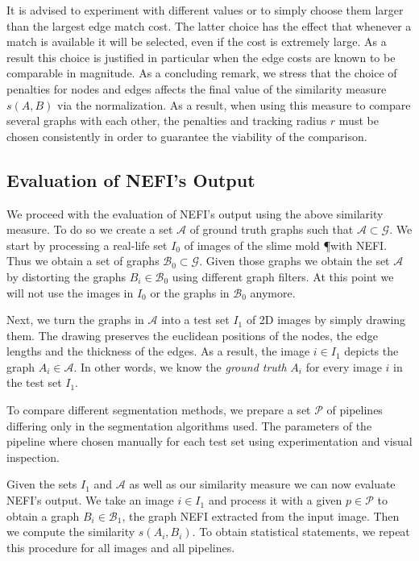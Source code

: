 		It is advised to experiment with different values or to simply choose them larger than the largest edge match cost. The latter choice has the effect that whenever a match is available it will be selected, even if the cost is extremely large. As a result this choice is justified in particular when the edge costs are known to be comparable in magnitude. As a concluding remark, we stress that the choice of penalties for nodes and edges affects the final value of the similarity measure $s(A, B)$ via the normalization. As a result, when using this measure to compare several graphs with each other, the penalties and tracking radius $r$ must be chosen consistently in order to guarantee the viability of the comparison.

	\subsection{Evaluation of NEFI's Output}

		We proceed with the evaluation of NEFI's output using the above similarity measure. To do so we create a set $\mathcal{A}$ of ground truth graphs such that $\mathcal{A} \subset \mathcal{G}$. We start by processing a real-life set $I_0$ of images of the slime mold \P with NEFI. Thus we obtain a set of graphs $\mathcal{B}_0 \subset \mathcal{G}$. Given those graphs we obtain the set $\mathcal{A}$ by distorting the graphs $B_i \in \mathcal{B}_0$ using different graph filters. At this point we will not use the images in $I_0$ or the graphs in $\mathcal{B}_0$ anymore. 

		Next, we turn the graphs in $\mathcal{A}$ into a test set $I_1$ of 2D images by simply drawing them. The drawing preserves the euclidean positions of the nodes, the edge lengths and the thickness of the edges. As a result, the image $i \in I_1$ depicts the graph $ A_i \in \mathcal{A}$. In other words, we know the \emph{ground truth} $A_i$ for every image $i$ in the test set $I_1$.

		To compare different segmentation methods, we prepare a set $\mathcal{P}$ of pipelines differing only in the segmentation algorithms used. The parameters of the pipeline where chosen manually for each test set using experimentation and visual inspection.

		Given the sets $I_1$ and $\mathcal{A}$ as well as our similarity measure we can now evaluate NEFI's output. We take an image $i \in I_1$ and process it with a given $p \in \mathcal{P}$ to obtain a graph $B_i \in \mathcal{B}_1$, \ie the graph NEFI extracted from the input image. Then we compute the similarity $s(A_i, B_i)$. To obtain statistical statements, we repeat this procedure for all images and all pipelines.

